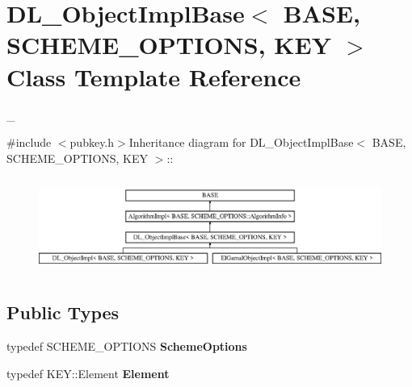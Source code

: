 \hypertarget{class_d_l___object_impl_base}{
\section{DL\_\-ObjectImplBase$<$ BASE, SCHEME\_\-OPTIONS, KEY $>$ Class Template Reference}
\label{class_d_l___object_impl_base}
}


\_\-  


{\ttfamily \#include $<$pubkey.h$>$}Inheritance diagram for DL\_\-ObjectImplBase$<$ BASE, SCHEME\_\-OPTIONS, KEY $>$::\begin{figure}[H]
\begin{center}
\leavevmode
\includegraphics[height=3.14607cm]{class_d_l___object_impl_base}
\end{center}
\end{figure}
\subsection*{Public Types}
\begin{DoxyCompactItemize}
\item 
\hypertarget{class_d_l___object_impl_base_ac6f5ed674de19651ef59f5ffca06c1d3}{
typedef SCHEME\_\-OPTIONS {\bfseries SchemeOptions}}
\label{class_d_l___object_impl_base_ac6f5ed674de19651ef59f5ffca06c1d3}

\item 
\hypertarget{class_d_l___object_impl_base_ab752cc22846eb3dffe4a9a16ca668e42}{
typedef KEY::Element {\bfseries Element}}
\label{class_d_l___object_impl_base_ab752cc22846eb3dffe4a9a16ca668e42}

\end{DoxyCompactItemize}
